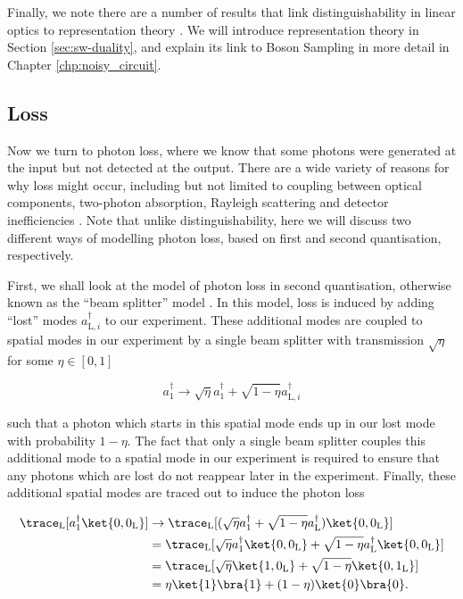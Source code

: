 Finally, we note there are a number of results that link distinguishability in linear optics to representation theory \cite{adamson2008, deguise2014, turner2016, menssen2017, stanisic2018}. We will introduce representation theory in Section \ref{sec:sw-duality}, and explain its link to Boson Sampling in more detail in Chapter \ref{chp:noisy_circuit}.

\subsection{Loss}
\label{ssec:imperfections-loss}

Now we turn to photon loss, where we know that some photons were generated at the input but not detected at the output. There are a wide variety of reasons for why loss might occur, including but not limited to coupling between optical components, two-photon absorption, Rayleigh scattering and detector inefficiencies \cite{silverstone2016, rosenfeld2019}. Note that unlike distinguishability, here we will discuss two different ways of modelling photon loss, based on first and second quantisation, respectively.

First, we shall look at the model of photon loss in second quantisation, otherwise known as the ``beam splitter'' model \cite{oszmaniec2018, garciapatron2017, brod2019}. In this model, loss is induced by adding ``lost'' modes $a_{\textrm{L},i}^\dagger$ to our experiment. These additional modes are coupled to spatial modes in our experiment by a single beam splitter with transmission $\sqrt{\eta}$ for some $\eta \in [0,1]$

\begin{equation}
a_1^\dagger \rightarrow \sqrt{\eta} a_1^\dagger + \sqrt{1-\eta}a_{\textrm{L}, i}^\dagger
\end{equation}

\noindent such that a photon which starts in this spatial mode ends up in our lost mode with probability $1 - \eta$. The fact that only a single beam splitter couples this additional mode to a spatial mode in our experiment is required to ensure that any photons which are lost do not reappear later in the experiment. Finally, these additional spatial modes are traced out to induce the photon loss

\begin{align}
\trace_{\textrm{L}}[a_1^\dagger\ket{0,0_{\textrm{L}}}] &\rightarrow \trace_{\textrm{L}}[(\sqrt{\eta}a_1^\dagger + \sqrt{1-\eta}a_{\textrm{L}}^\dagger)\ket{0,0_{\textrm{L}}}]\\
&= \trace_{\textrm{L}}[\sqrt{\eta}a_1^\dagger\ket{0,0_{\textrm{L}}} + \sqrt{1-\eta}a_{\textrm{L}}^\dagger\ket{0,0_{\textrm{L}}}]\\
&= \trace_{\textrm{L}}[\sqrt{\eta}\ket{1,0_{\textrm{L}}} + \sqrt{1-\eta}\ket{0,1_{\textrm{L}}}]\\
&= \eta\ket{1}\bra{1} + (1-\eta)\ket{0}\bra{0}.
\end{align}

